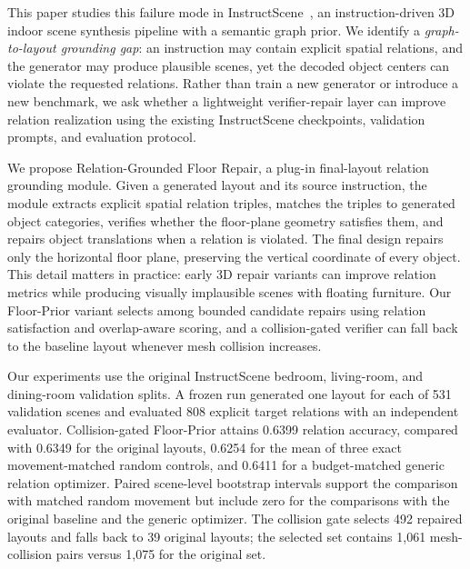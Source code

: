 \documentclass{article}
\newcommand{\method}{Relation-Grounded Floor Repair}
\newcommand{\fp}{Floor-Prior}
\begin{document}
This paper studies this failure mode in InstructScene~\citep{lin2024instructscene}, an instruction-driven 3D indoor scene synthesis pipeline with a semantic graph prior. We identify a \emph{graph-to-layout grounding gap}: an instruction may contain explicit spatial relations, and the generator may produce plausible scenes, yet the decoded object centers can violate the requested relations. Rather than train a new generator or introduce a new benchmark, we ask whether a lightweight verifier-repair layer can improve relation realization using the existing InstructScene checkpoints, validation prompts, and evaluation protocol.

We propose \method, a plug-in final-layout relation grounding module. Given a generated layout and its source instruction, the module extracts explicit spatial relation triples, matches the triples to generated object categories, verifies whether the floor-plane geometry satisfies them, and repairs object translations when a relation is violated. The final design repairs only the horizontal floor plane, preserving the vertical coordinate of every object. This detail matters in practice: early 3D repair variants can improve relation metrics while producing visually implausible scenes with floating furniture. Our \fp{} variant selects among bounded candidate repairs using relation satisfaction and overlap-aware scoring, and a collision-gated verifier can fall back to the baseline layout whenever mesh collision increases.

Our experiments use the original InstructScene bedroom, living-room, and dining-room validation splits. A frozen run generated one layout for each of 531 validation scenes and evaluated 808 explicit target relations with an independent evaluator. Collision-gated \fp{} attains 0.6399 relation accuracy, compared with 0.6349 for the original layouts, 0.6254 for the mean of three exact movement-matched random controls, and 0.6411 for a budget-matched generic relation optimizer. Paired scene-level bootstrap intervals support the comparison with matched random movement but include zero for the comparisons with the original baseline and the generic optimizer. The collision gate selects 492 repaired layouts and falls back to 39 original layouts; the selected set contains 1,061 mesh-collision pairs versus 1,075 for the original set.
\end{document}
